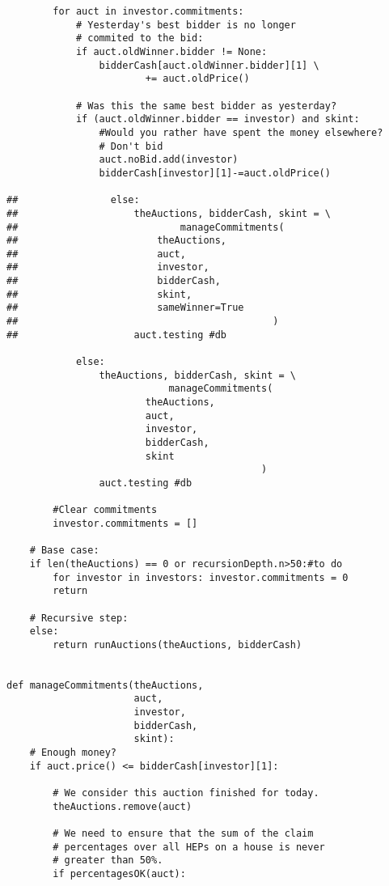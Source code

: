 \begin{lstlisting}
        for auct in investor.commitments:
            # Yesterday's best bidder is no longer
            # commited to the bid:
            if auct.oldWinner.bidder != None:
                bidderCash[auct.oldWinner.bidder][1] \
                        += auct.oldPrice()
            
            # Was this the same best bidder as yesterday?
            if (auct.oldWinner.bidder == investor) and skint:
                #Would you rather have spent the money elsewhere?
                # Don't bid
                auct.noBid.add(investor)
                bidderCash[investor][1]-=auct.oldPrice()

##                else:
##                    theAuctions, bidderCash, skint = \
##                            manageCommitments(
##                        theAuctions,
##                        auct,
##                        investor,
##                        bidderCash,
##                        skint,
##                        sameWinner=True
##                                            )
##                    auct.testing #db

            else:
                theAuctions, bidderCash, skint = \
                            manageCommitments(
                        theAuctions,
                        auct,
                        investor,
                        bidderCash,
                        skint
                                            )
                auct.testing #db
                
        #Clear commitments
        investor.commitments = []

    # Base case:
    if len(theAuctions) == 0 or recursionDepth.n>50:#to do
        for investor in investors: investor.commitments = 0
        return

    # Recursive step:
    else:
        return runAuctions(theAuctions, bidderCash)


def manageCommitments(theAuctions,
                      auct,
                      investor,
                      bidderCash,
                      skint):
    # Enough money?
    if auct.price() <= bidderCash[investor][1]:

        # We consider this auction finished for today.
        theAuctions.remove(auct)

        # We need to ensure that the sum of the claim
        # percentages over all HEPs on a house is never
        # greater than 50%.
        if percentagesOK(auct):
            

\end{lstlisting}
